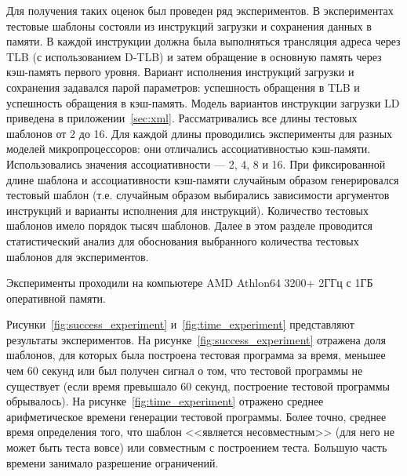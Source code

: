 Для получения таких оценок был проведен ряд экспериментов. В экспериментах тестовые шаблоны состояли из инструкций загрузки и сохранения
данных в памяти. В каждой инструкции должна была выполняться трансляция адреса
через TLB (с использованием D-TLB) и затем обращение в основную память через
кэш-память первого уровня. Вариант исполнения инструкций загрузки и сохранения задавался парой параметров: успешность обращения в TLB и успешность обращения в кэш-память. Модель вариантов инструкции загрузки LD приведена в приложении~\ref{sec:xml}. Рассматривались все длины тестовых шаблонов от 2 до
16. Для каждой длины проводились эксперименты для разных моделей микропроцессоров: они отличались ассоциативностью кэш-памяти. Использовались значения ассоциативности --- 2, 4, 8 и 16. При фиксированной длине шаблона и ассоциативности кэш-памяти случайным образом генерировался тестовый шаблон (т.е. случайным образом выбирались зависимости аргументов инструкций и варианты исполнения для инструкций). Количество тестовых шаблонов имело порядок тысяч шаблонов. Далее в этом разделе проводится статистический анализ для обоснования выбранного количества тестовых шаблонов для экспериментов.

Эксперименты проходили на компьютере AMD Athlon64 3200+ 2ГГц с 1ГБ оперативной памяти.

Рисунки~\ref{fig:success_experiment} и~\ref{fig:time_experiment} представляют
результаты экспериментов. На рисунке~\ref{fig:success_experiment} отражена доля
шаблонов, для которых была построена тестовая программа за время, меньшее чем 60 секунд или был получен сигнал о том, что тестовой программы не существует (если время превышало 60 секунд, построение тестовой программы обрывалось). На рисунке~\ref{fig:time_experiment} отражено среднее арифметическое времени генерации тестовой программы. Более точно, среднее время определения того, что шаблон <<является несовместным>> (для него не может быть теста вовсе) или
совместным с построением теста. Большую часть времени занимало разрешение ограничений.


